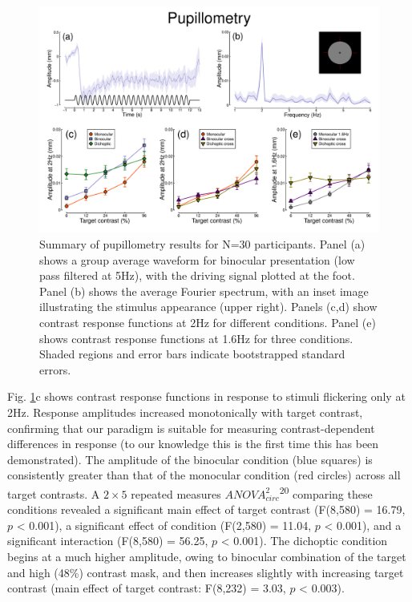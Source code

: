 \documentclass[
]{article}
\begin{document}
\begin{figure}

{\centering \includegraphics{Figures/pupildata} 

}

\caption{Summary of pupillometry results for N=30 participants. Panel (a) shows a group average waveform for binocular presentation (low pass filtered at 5Hz), with the driving signal plotted at the foot. Panel (b) shows the average Fourier spectrum, with an inset image illustrating the stimulus appearance (upper right). Panels (c,d) show contrast response functions at 2Hz for different conditions. Panel (e) shows contrast response functions at 1.6Hz for three conditions. Shaded regions and error bars indicate bootstrapped standard errors.}\label{fig:pupildata}
\end{figure}

Fig. \ref{fig:pupildata}c shows contrast response functions in response to stimuli flickering only at 2Hz. Response amplitudes increased monotonically with target contrast, confirming that our paradigm is suitable for measuring contrast-dependent differences in response (to our knowledge this is the first time this has been demonstrated). The amplitude of the binocular condition (blue squares) is consistently greater than that of the monocular condition (red circles) across all target contrasts. A \(2\times5\) repeated measures \(ANOVA^2_{circ}\)\textsuperscript{20} comparing these conditions revealed a significant main effect of target contrast (F(8,580) = 16.79, \(p\) \textless{} 0.001), a significant effect of condition (F(2,580) = 11.04, \(p\) \textless{} 0.001), and a significant interaction (F(8,580) = 56.25, \(p\) \textless{} 0.001). The dichoptic condition begins at a much higher amplitude, owing to binocular combination of the target and high (48\%) contrast mask, and then increases slightly with increasing target contrast (main effect of target contrast: F(8,232) = 3.03, \(p\) \textless{} 0.003).
\end{document}
